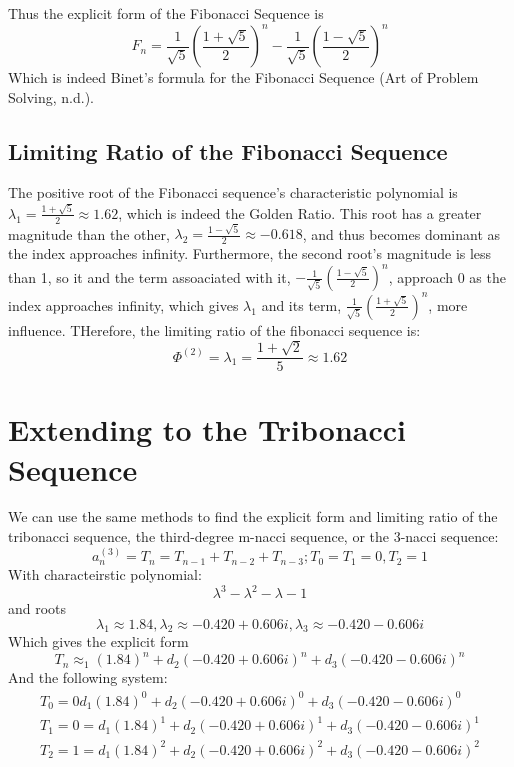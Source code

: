 \documentclass[11pt]{article}
\begin{document}
Thus the explicit form of the Fibonacci Sequence is
    \[F_n=\frac{1}{\sqrt{5}}\left(\frac{1+\sqrt{5}}{2}\right)^n-\frac{1}{\sqrt{5}}\left(\frac{1-\sqrt{5}}{2}\right)^n\]
Which is indeed Binet's formula for the Fibonacci Sequence (Art of Problem Solving, n.d.).

\subsection{Limiting Ratio of the Fibonacci Sequence}
The positive root of the Fibonacci sequence's characteristic polynomial is $\lambda_1=\frac{1+\sqrt{5}}{2}\approx 1.62$, which is indeed the Golden Ratio. This root has a greater magnitude than the other, $\lambda_2=\frac{1-\sqrt{5}}{2}\approx-0.618$, and thus becomes dominant as the index approaches infinity. Furthermore, the second root's magnitude is less than 1, so it and the term assoaciated with it, \(-\frac{1}{\sqrt{5}}\left(\frac{1-\sqrt{5}}{2}\right)^n\), approach 0 as the index approaches infinity, which gives \(\lambda_1\) and its term, \(\frac{1}{\sqrt{5}}\left(\frac{1+\sqrt{5}}{2}\right)^n\), more influence. THerefore, the limiting ratio of the fibonacci sequence is:
\[\Phi^{(2)}=\lambda_1=\frac{1+\sqrt{2}}{5}\approx1.62\]



\section{Extending to the Tribonacci Sequence}
We can use the same methods to find the explicit form and limiting ratio of the tribonacci sequence, the third-degree m-nacci sequence, or the 3-nacci sequence:
$$a_{n}^{(3)}=T_n=T_{n-1}+T_{n-2}+T_{n-3};T_0=T_1=0, T_2=1$$
With characteirstic polynomial:
\[\lambda^3-\lambda^2-\lambda-1\]
and roots
\[\lambda_1 \approx 1.84, \lambda_2 \approx -0.420 + 0.606i, \lambda_3 \approx -0.420 - 0.606i\]
Which gives the explicit form
\[T_n\approx_1(1.84)^n+d_2(-0.420 + 0.606i)^n+d_3(-0.420 - 0.606i)^n\]
And the following system:
\begin{align*}
    T_0=0d_1(1.84)^0+d_2(-0.420 + 0.606i)^0+d_3(-0.420 - 0.606i)^0 \\
    T_1=0=d_1(1.84)^1+d_2(-0.420 + 0.606i)^1+d_3(-0.420 - 0.606i)^1 \\
    T_2=1=d_1(1.84)^2+d_2(-0.420 + 0.606i)^2+d_3(-0.420 - 0.606i)^2
\end{align*}
\end{document}
